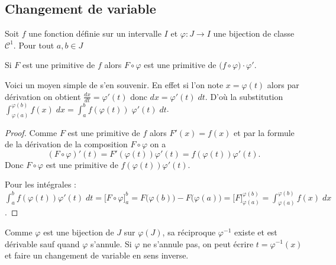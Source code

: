 \documentclass[class=report,crop=false]{standalone}
\begin{document}
\subsection{Changement de variable}

\begin{theoreme}
Soit $f$ une fonction définie sur un intervalle $I$ et $\varphi : J \to I$ une bijection de classe $\mathcal{C}^1$.
Pour tout $a,b\in J$

Si $F$ est une primitive de $f$ alors $F\circ \varphi$ est une primitive de
$\big(f \circ \varphi\big)\cdot\varphi'$.
\end{theoreme}


Voici un moyen simple de s'en souvenir. En effet si l'on note
$x=\varphi(t)$ alors par dérivation on obtient $\frac{dx}{dt} = \varphi'(t)$ donc
$dx = \varphi'(t) \; dt$. D'où la substitution
$\int_{\varphi(a)}^{\varphi(b)} f(x) \; dx = \int_a^b f(\varphi(t)) \; \varphi'(t) \; dt$.

\begin{proof}
Comme $F$ est une primitive de $f$ alors $F'(x)=f(x)$ et
par la formule de la dérivation de la composition $F\circ \varphi$ on a
$$(F\circ\varphi)'(t)=F'(\varphi(t))\varphi'(t)=f(\varphi(t))\varphi'(t).$$
Donc $F\circ \varphi$ est une primitive de $f(\varphi(t))\varphi'(t)$.

Pour les intégrales :
 $\displaystyle\int_a^b f(\varphi(t))\varphi'(t) \; dt = \big[ F\circ \varphi\big]_a^b
= F\big(\varphi(b)\big)-F\big(\varphi(a)\big) = \big[ F\big]_{\varphi(a)}^{\varphi(b)}
= \int_{\varphi(a)}^{\varphi(b)} f(x) \; dx$.
\end{proof}


\begin{remarque*}
Comme $\varphi$ est une bijection de $J$ sur $\varphi(J)$, sa réciproque $\varphi^{-1}$ existe et
est dérivable sauf quand $\varphi$ s'annule. Si $\varphi$ ne s'annule pas, on peut écrire $t=\varphi^{-1}(x)$
et faire un changement de variable en sens inverse.
\end{remarque*}
\end{document}
